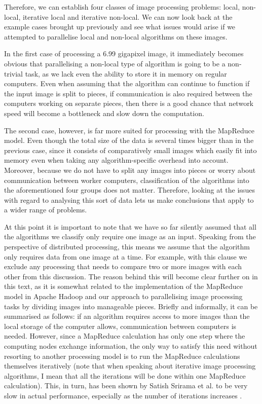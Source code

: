\documentclass [12pt,a4paper]{report}
\begin{document}
Therefore, we can establish four classes of image processing problems: local, non-local, iterative local and iterative non-local. We can now look back at the example cases brought up previously and see what issues would arise if we attempted to parallelise local and non-local algorithms on these images.

In the first case of processing a 6.99 gigapixel image, it immediately becomes obvious that parallelising a non-local type of algorithm is going to be a non-trivial task, as we lack even the ability to store it in memory on regular computers. Even when assuming that the algorithm can continue to function if the input image is split to pieces, if communication is also required between the computers working on separate pieces, then there is a good chance that network speed will become a bottleneck and slow down the computation.

The second case, however, is far more suited for processing with the MapReduce model. Even though the total size of the data is several times bigger than in the previous case, since it consists of comparatively small images which easily fit into memory even when taking any algorithm-specific overhead into account. Moreover, because we do not have to split any images into pieces or worry about communication between worker computers, classification of the algorithms into the aforementioned four groups does not matter. Therefore, looking at the issues with regard to analysing this sort of data lets us make conclusions that apply to a wider range of problems. 

At this point it is important to note that we have so far silently assumed that all the algorithms we classify only require one image as an input. Speaking from the perspective of distributed processing, this means we assume that the algorithm only requires data from one image at a time. For example, with this clause we exclude any processing that needs to compare two or more images with each other from this discussion. The reason behind this will become clear further on in this text, as it is somewhat related to the implementation of the MapReduce model in Apache Hadoop and our approach to parallelising image processing tasks by dividing images into manageable pieces. Briefly and informally, it can be summarised as follows: if an algorithm requires access to more images than the local storage of the computer allows, communication between computers is needed. However, since a MapReduce calculation has only one step where the computing nodes exchange information, the only way to satisfy this need without resorting to another processing model is to run the MapReduce calculations themselves iteratively (note that when speaking about iterative image processing algorithms, I mean that all the iterations will be done within one MapReduce calculation). This, in turn, has been shown by Satish Srirama et al. to be very slow in actual performance, especially as the number of iterations increases \cite{srirama2012adapting}.
\end{document}
